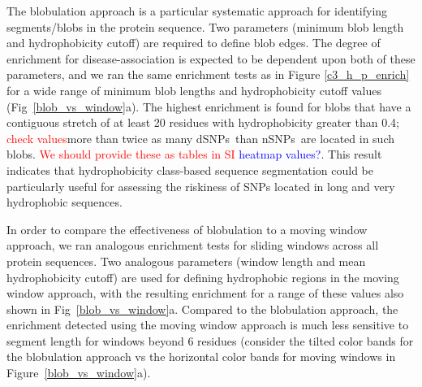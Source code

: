 \documentclass[10pt,letterpaper]{article}
\newcommand{\dSNPs}{dSNPs~}
\newcommand{\nSNPs}{nSNPs~}
\newcommand{\hydrochar}{hydrophobicity class}
\newcommand{\grace}[1]{\textcolor{red}{#1}}
\newcommand{\ruchi}[1]{\textcolor{blue}{#1}}
\begin{document}
The blobulation approach is a particular systematic approach for identifying segments/blobs in the protein sequence. Two parameters (minimum blob length and hydrophobicity cutoff) are required to define blob edges. The degree of enrichment for disease-association is expected to be dependent upon both of these parameters, and we ran the same enrichment tests as in Figure \ref{c3_h_p_enrich} for a wide range of minimum blob lengths and hydrophobicity cutoff values (Fig~\ref{blob_vs_window}a). The highest enrichment is found for blobs that have a contiguous stretch of at least 20 residues with hydrophobicity greater than 0.4; \grace{check values}more than twice as many \dSNPs than \nSNPs are located in such blobs.  \grace{We should provide these as tables in SI} \ruchi{heatmap values?}.
This result indicates that \hydrochar{}-based sequence segmentation could be particularly useful for assessing the riskiness of SNPs located in long and very hydrophobic sequences.   



In order to compare the effectiveness of blobulation to a moving window approach, we ran analogous enrichment tests for sliding windows across all protein sequences. Two analogous parameters (window length and mean hydrophobicity cutoff) are used for defining hydrophobic regions in the moving window approach, with the resulting enrichment for a range of these values also shown in Fig~\ref{blob_vs_window}a.  Compared to the blobulation approach,  the enrichment detected using the moving window approach is much less sensitive to segment length for windows beyond 6 residues (consider the tilted color bands for the blobulation approach vs the horizontal color bands for moving windows in Figure~\ref{blob_vs_window}a).   
\end{document}
